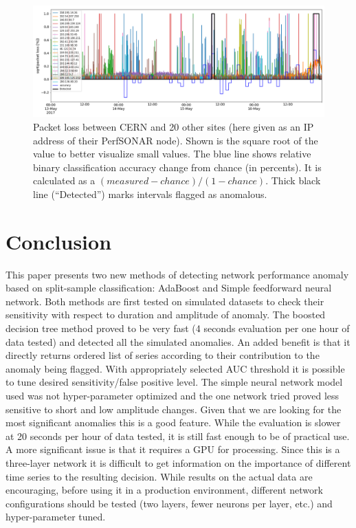 \documentclass[5p]{elsarticle}
\begin{document}
\begin{figure}[htbp]
    \centering
    \includegraphics[width=\linewidth]{nn_all.png}
    \caption{Packet loss between CERN and 20 other sites (here given as an IP address of their PerfSONAR node). Shown is the square root of the value to better visualize small values. The blue line shows relative binary classification accuracy change from chance (in percents). It is calculated as a $(measured - chance)/ (1-chance)$. Thick black line (“Detected”) marks intervals flagged as anomalous.}
    \label{fig:nn_all}
\end{figure}


\section{Conclusion}

This paper presents two new methods of detecting network performance anomaly based on split-sample classification: AdaBoost and Simple feedforward neural network. Both methods are first tested on simulated datasets to check their sensitivity with respect to duration and amplitude of anomaly. The boosted decision tree method proved to be very fast (4 seconds evaluation per one hour of data tested) and detected all the simulated anomalies. An added benefit is that it directly returns ordered list of series according to their contribution to the anomaly being flagged. With appropriately selected AUC threshold it is possible to tune desired sensitivity/false positive level. 
The simple neural network model used was not hyper-parameter optimized and the one network tried proved less sensitive to short and low amplitude changes. Given that we are looking for the most significant anomalies this is a good feature. While the evaluation is slower at 20 seconds per hour of data tested, it is still fast enough to be of practical use. A more significant issue is that it requires a GPU for processing. Since this is a three-layer network it is difficult to get information on the importance of different time series to the resulting decision. While results on the actual data are encouraging, before using it in a production environment, different network configurations should be tested (two layers, fewer neurons per layer, etc.) and hyper-parameter tuned.  
\end{document}
